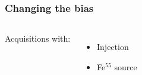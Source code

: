     \begin{frame}
        \frametitle{Changing the bias}
        \begin{columns}
                Acquisitions with:
                \begin{itemize}
                    \item Injection
                    \item Fe$^{55}$ source
                \end{itemize}
                \begin{table}
                    \begin{center}
                    \end{center}
                \end{table}
        \end{columns}
 

\end{frame}
